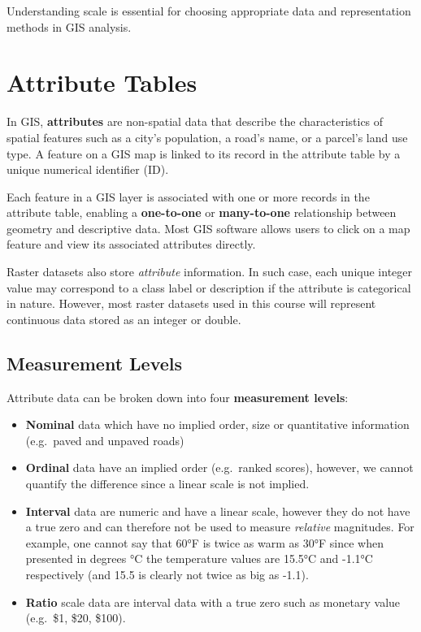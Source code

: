 \documentclass[
  letterpaper,
]{book}
\begin{document}
Understanding scale is essential for choosing appropriate data and
representation methods in GIS analysis.

\section{Attribute Tables}\label{attribute-tables}

In GIS, \textbf{attributes} are non-spatial data that describe the
characteristics of spatial features such as a city's population, a
road's name, or a parcel's land use type. A feature on a GIS map is
linked to its record in the attribute table by a unique numerical
identifier (ID).

Each feature in a GIS layer is associated with one or more records in
the attribute table, enabling a \textbf{one-to-one} or
\textbf{many-to-one} relationship between geometry and descriptive data.
Most GIS software allows users to click on a map feature and view its
associated attributes directly.

Raster datasets also store \emph{attribute} information. In such case,
each unique integer value may correspond to a class label or description
if the attribute is categorical in nature. However, most raster datasets
used in this course will represent continuous data stored as an integer
or double.

\subsection{Measurement Levels}\label{measurement-levels}

Attribute data can be broken down into four \textbf{measurement levels}:

\begin{itemize}
\item
  \textbf{Nominal} data which have no implied order, size or
  quantitative information (e.g.~paved and unpaved roads)
\item
  \textbf{Ordinal} data have an implied order (e.g.~ranked scores),
  however, we cannot quantify the difference since a linear scale is not
  implied.
\item
  \textbf{Interval} data are numeric and have a linear scale, however
  they do not have a true zero and can therefore not be used to measure
  \emph{relative} magnitudes. For example, one cannot say that 60°F is
  twice as warm as 30°F since when presented in degrees °C the
  temperature values are 15.5°C and -1.1°C respectively (and 15.5 is
  clearly not twice as big as -1.1).
\item
  \textbf{Ratio} scale data are interval data with a true zero such as
  monetary value (e.g.~\$1, \$20, \$100).
\end{itemize}
\end{document}
